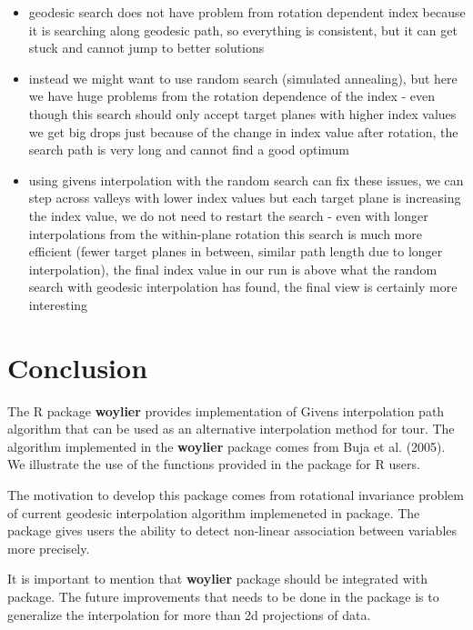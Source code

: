 \begin{itemize}
\tightlist
\item
  geodesic search does not have problem from rotation dependent index because it is searching along geodesic path, so everything is consistent, but it can get stuck and cannot jump to better solutions
\item
  instead we might want to use random search (simulated annealing), but here we have huge problems from the rotation dependence of the index - even though this search should only accept target planes with higher index values we get big drops just because of the change in index value after rotation, the search path is very long and cannot find a good optimum
\item
  using givens interpolation with the random search can fix these issues, we can step across valleys with lower index values but each target plane is increasing the index value, we do not need to restart the search - even with longer interpolations from the within-plane rotation this search is much more efficient (fewer target planes in between, similar path length due to longer interpolation), the final index value in our run is above what the random search with geodesic interpolation has found, the final view is certainly more interesting
\end{itemize}

\hypertarget{conclusion}{%
\section{Conclusion}\label{conclusion}}

The R package \textbf{woylier} provides implementation of Givens interpolation path algorithm that can be used as an alternative interpolation method for tour. The algorithm implemented in the \textbf{woylier} package comes from Buja et al. (2005). We illustrate the use of the functions provided in the package for R users.

The motivation to develop this package comes from rotational invariance problem of current geodesic interpolation algorithm implemeneted in  package. The package gives users the ability to detect non-linear association between variables more precisely.

It is important to mention that \textbf{woylier} package should be integrated with  package. The future improvements that needs to be done in the package is to generalize the interpolation for more than 2d projections of data.

